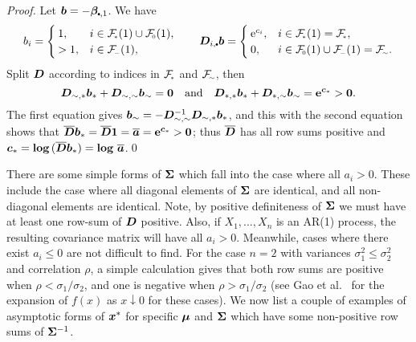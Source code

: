 \begin{proof}
Let $\bfb = -\bfbeta_{\sbullet,1}$. We have
\[
	b_i = \begin{cases}
		1, & i \in \Fset{*}(1) \cup \Fset{0}(1), \\
		>1, & i \in \Fset{-}(1),
	\end{cases}
	\qquad
	\bfD_{i,\sbullet} \bfb = \begin{cases}
		\e^{c_i}, & i \in \Fset{*}(1) = \Fset{*}, \\
		0, & i \in \Fset{0}(1) \cup \Fset{-}(1) = \Fset{\sim}.
	\end{cases}
\]
Split $\bm{D}$ according to indices in $\Fset{*}$ and $\Fset{\sim}$, then
%
\[ \bm{D}_{{\sim},{*}} \bm{b}_{*} + \bm{D}_{{\sim},{\sim}} \bm{b}_{\sim} = \bm{0}
\quad \text{and}
 \quad \bm{D}_{{*},{*}} \bm{b}_{*} + \bm{D}_{{*},{\sim}} \bm{b}_{\sim}  =
 \bm{\mathrm{e}}^{\bm{c}_{*}}  > \bm{0}. \]
%
The first equation gives $\bm{b}_{{\sim}} =  - \bm{D}_{{\sim},{\sim}}^{-1}
\bm{D}_{{\sim},{*}} \bm{b}_{*}$, and this with the second equation shows
that
$ \overline{\bm{D}} \bm{b}_{*} = \overline{\bm{D}} \bm{1} = \overline{\bm{a}} =
\bm{\mathrm{e}}^{\bm{c}_{*}} > \bm{0} $;
thus $\overline{\bm{D}}$ has all row sums positive and
$\bm{c}_{*} = \bm{\mathrm{log}}\,(\overline{\bm{D}}\bm{b}_{*}) = \bm{\mathrm{log}}\,\,\overline{\bm{a}}$.\qed
\end{proof}

There are some simple forms of $\bm{\Sigma}$ which fall into the case where all
$a_i > 0$. These include the case where all diagonal elements of $\bm{\Sigma}$
are identical, and all non-diagonal elements are identical. Note, by positive
definiteness of $\bm{\Sigma}$ we must have at least one row-sum of $\bm{D}$ positive. Also,
if $X_1, \dots, X_n$ is an AR(1) process, the resulting covariance matrix
will have all $a_i > 0$. Meanwhile, cases where there exist  $a_i \leq 0$ are
not difficult to find. For the case $n=2$ with variances $\sigma_1^2 \leq
\sigma_2^2$ and correlation $\rho$, a simple calculation gives that both row
sums are positive when $\rho < \sigma_1 / \sigma_2$, and one is negative when
$\rho > \sigma_1 / \sigma_2$ (see Gao et al.\ \cite{gao2009asymptotic} for the
expansion of $f(x)$ as $x \downarrow 0$ for these cases). We now list a couple
of examples of asymptotic forms of $\bm{x}^*$ for specific $\bm{\mu}$ and
$\bm{\Sigma}$ which have some non-positive row sums of $\bm{\Sigma}^{-1}$.

